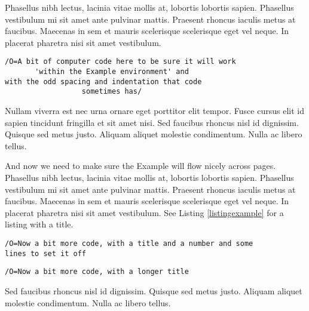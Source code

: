\begin{leftbar} 
{Phasellus nibh lectus, lacinia vitae mollis at, lobortis lobortis sapien. Phasellus vestibulum mi sit amet ante pulvinar mattis. Praesent rhoncus iaculis metus at faucibus. Maecenas in sem et mauris scelerisque scelerisque eget vel neque. In placerat pharetra nisi sit amet vestibulum. 
\begin{lstlisting} 
/O=A bit of computer code here to be sure it will work
       'within the Example environment' and 
with the odd spacing and indentation that code 
                  sometimes has/       
\end{lstlisting}
Nullam viverra est nec urna ornare eget porttitor elit tempor. Fusce cursus elit id sapien tincidunt fringilla et sit amet nisi. Sed faucibus rhoncus nisl id dignissim. Quisque sed metus justo. Aliquam aliquet molestie condimentum. Nulla ac libero tellus. }
\end{leftbar}

\begin{leftbar}
{And now we need to make sure the Example will flow nicely across pages.  Phasellus nibh lectus, lacinia vitae mollis at, lobortis lobortis sapien. Phasellus vestibulum mi sit amet ante pulvinar mattis. Praesent rhoncus iaculis metus at faucibus. Maecenas in sem et mauris scelerisque scelerisque eget vel neque. In placerat pharetra nisi sit amet vestibulum. See Listing \ref{listingexample} for a listing with a title. 
\begin{lstlisting}[caption={This is the Listing Title.},label={listingexample},frame=tb]
/O=Now a bit more code, with a title and a number and some
lines to set it off             
\end{lstlisting}
\begin{lstlisting}[caption={And if the title is long enough to run over two lines, then it is set flushleft rather than centered.},label={listingexample},frame=tb]
/O=Now a bit more code, with a longer title            
\end{lstlisting}
Sed faucibus rhoncus nisl id dignissim. Quisque sed metus justo. Aliquam aliquet molestie condimentum. Nulla ac libero tellus. }
\end{leftbar}

